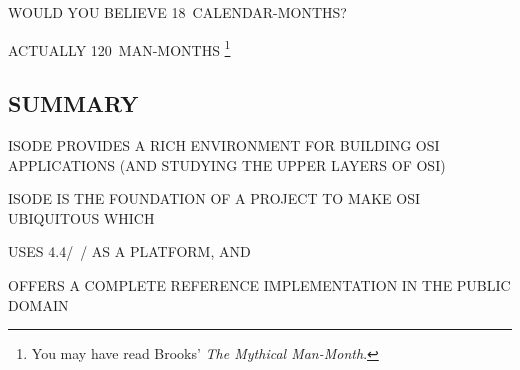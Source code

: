 \begin{bwslide}

\begin{nrtc}
\item	WOULD YOU BELIEVE 18~CALENDAR-MONTHS?

\item	ACTUALLY 120~MAN-MONTHS%
	\footnote{You may have read Brooks' {\em The Mythical Man-Month}.}
\end{nrtc}
\end{bwslide}


\begin{bwslide}
\part*	{SUMMARY}\bf

\begin{nrtc}
\item	ISODE PROVIDES A RICH ENVIRONMENT FOR BUILDING OSI APPLICATIONS
	(AND STUDYING THE UPPER LAYERS OF OSI)

\item	ISODE IS THE FOUNDATION OF A PROJECT TO MAKE OSI UBIQUITOUS WHICH
    \begin{nrtc}
    \item	USES 4.4\bsd/~\unix/ AS A PLATFORM, AND

    \item	OFFERS A COMPLETE REFERENCE IMPLEMENTATION IN THE PUBLIC DOMAIN
    \end{nrtc}
\end{nrtc}
\end{bwslide}



